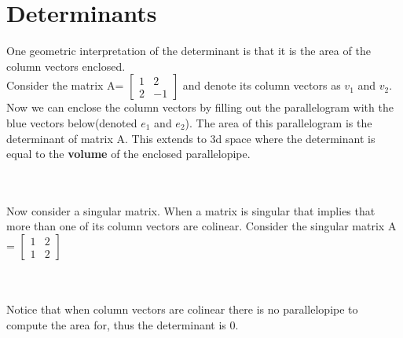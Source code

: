 \documentclass{article}
\begin{document}
\section{Determinants}
One geometric interpretation of the determinant is that it is the area of the column vectors enclosed.\\
Consider the matrix A=
$\begin{bmatrix}
1 & 2\\
2 & -1 
\end{bmatrix}$ and denote its column vectors as $v_1$ and $v_2$. Now we can enclose the column vectors by filling out the parallelogram with the blue vectors below(denoted $e_1$ and $e_2$). The area of this parallelogram is the determinant of matrix A. This extends to 3d space where the determinant is equal to the \textbf{volume} of the enclosed parallelopipe. \\
\\\\
Now consider a singular matrix. When a matrix is singular that implies that more than one of its column vectors are colinear. Consider the singular matrix A = 
$\begin{bmatrix}
1 & 2 \\
1 & 2
\end{bmatrix}$\\
\\\\
Notice that when column vectors are colinear there is no parallelopipe to compute the area for, thus the determinant is 0.\\
\end{document}
